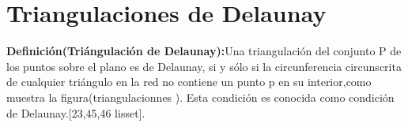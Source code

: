 \documentclass[12pt]{report}
\begin{document}

\section{Triangulaciones de Delaunay}
\textbf{Definición(Triángulación de Delaunay):}Una triangulación del conjunto P de los puntos sobre el plano es de Delaunay, si y sólo si la circunferencia circunscrita de cualquier triángulo en la red no contiene un punto p en su interior,como muestra la figura(triangulacionnes ). Esta condición es conocida como condición de Delaunay.[23,45,46 lisset].    
\end{document}
